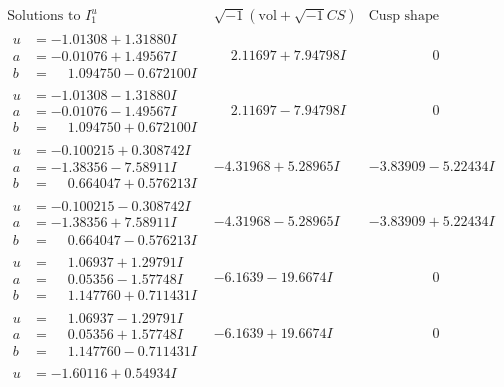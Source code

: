 \documentclass[1p]{elsarticle_modified}
\theoremstyle{definition}
\newcommand{\I}{\sqrt{-1}}
\begin{document}
$$\begin{array}{c|c|c}
\text{Solutions to }I^u_{1}& \I (\text{vol} + \sqrt{-1}CS) & \text{Cusp shape}\\
 \hline 
\begin{aligned}
u &= -1.01308 + 1.31880 I \\
a &= -0.01076 + 1.49567 I \\
b &= \phantom{-}1.094750 - 0.672100 I\end{aligned}
 & \phantom{-}2.11697 + 7.94798 I & \phantom{-0.000000 } 0 \\ \hline\begin{aligned}
u &= -1.01308 - 1.31880 I \\
a &= -0.01076 - 1.49567 I \\
b &= \phantom{-}1.094750 + 0.672100 I\end{aligned}
 & \phantom{-}2.11697 - 7.94798 I & \phantom{-0.000000 } 0 \\ \hline\begin{aligned}
u &= -0.100215 + 0.308742 I \\
a &= -1.38356 - 7.58911 I \\
b &= \phantom{-}0.664047 + 0.576213 I\end{aligned}
 & -4.31968 + 5.28965 I & -3.83909 - 5.22434 I \\ \hline\begin{aligned}
u &= -0.100215 - 0.308742 I \\
a &= -1.38356 + 7.58911 I \\
b &= \phantom{-}0.664047 - 0.576213 I\end{aligned}
 & -4.31968 - 5.28965 I & -3.83909 + 5.22434 I \\ \hline\begin{aligned}
u &= \phantom{-}1.06937 + 1.29791 I \\
a &= \phantom{-}0.05356 - 1.57748 I \\
b &= \phantom{-}1.147760 + 0.711431 I\end{aligned}
 & -6.1639 - 19.6674 I & \phantom{-0.000000 } 0 \\ \hline\begin{aligned}
u &= \phantom{-}1.06937 - 1.29791 I \\
a &= \phantom{-}0.05356 + 1.57748 I \\
b &= \phantom{-}1.147760 - 0.711431 I\end{aligned}
 & -6.1639 + 19.6674 I & \phantom{-0.000000 } 0 \\ \hline\begin{aligned}
u &= -1.60116 + 0.54934 I \\

\end{aligned}
\end{array}$$
\end{document}
